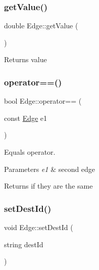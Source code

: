 \subsubsection{\texorpdfstring{get\+Value()}{getValue()}}
{\footnotesize\ttfamily double Edge\+::get\+Value (\begin{DoxyParamCaption}{ }\end{DoxyParamCaption})\hspace{0.3cm}{\ttfamily [inline]}}

\begin{DoxyReturn}{Returns}
value 
\end{DoxyReturn}
\mbox{\label{class_edge_a66b472219149d9f1f9349ceb1c345525}} 
\subsubsection{\texorpdfstring{operator==()}{operator==()}}
{\footnotesize\ttfamily bool Edge\+::operator== (\begin{DoxyParamCaption}\item[{const \mbox{\hyperlink{class_edge}{Edge}}}]{e1 }\end{DoxyParamCaption})\hspace{0.3cm}{\ttfamily [inline]}}



Equals operator. 


\begin{DoxyParams}{Parameters}
{\em e1} & second edge \\
\hline
\end{DoxyParams}
\begin{DoxyReturn}{Returns}
if they are the same 
\end{DoxyReturn}
\mbox{\label{class_edge_a71831bfad8dfce53b42c0a9e042b75bb}} 
\subsubsection{\texorpdfstring{set\+Dest\+Id()}{setDestId()}}
{\footnotesize\ttfamily void Edge\+::set\+Dest\+Id (\begin{DoxyParamCaption}\item[{string}]{dest\+Id }\end{DoxyParamCaption})\hspace{0.3cm}{\ttfamily [inline]}}



